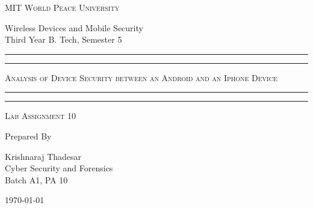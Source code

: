 \documentclass[11pt]{article}
\begin{document}
\begin{titlepage}
      \centering


      \huge\textsc{
            MIT World Peace University
      }\\

      \vspace{0.75\baselineskip} %

      \LARGE{
            Wireless Devices and Mobile Security\\
            Third Year B. Tech, Semester 5
      }

      \vfill %


      \rule{\textwidth}{1.6pt}\vspace*{-\baselineskip}\vspace*{2pt}
      \rule{\textwidth}{0.6pt}
      \vspace{0.75\baselineskip} %

      \huge{\textsc{
                  Analysis of Device Security between an Android and an Iphone Device
            }} \\

      \vspace{0.5\baselineskip} %
      \rule{\textwidth}{0.6pt}\vspace*{-\baselineskip}\vspace*{2.8pt}
      \rule{\textwidth}{1.6pt}

      \vspace{1\baselineskip} %


      \LARGE\textsc{
            Lab Assignment 10
      } %
      \vfill


      Prepared By \vspace{0.5\baselineskip} %

      \Large{
            Krishnaraj Thadesar \\
            Cyber Security and Forensics\\
            Batch A1, PA 10
      }

      \vspace{0.5\baselineskip} %
      \today

\end{titlepage}
\end{document}

